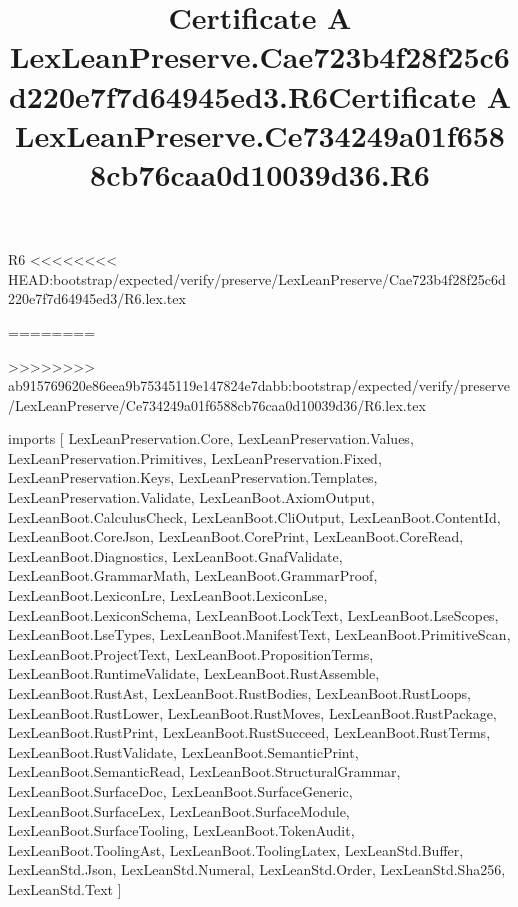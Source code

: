 \begin{lexlean}{R6}
<<<<<<<< HEAD:bootstrap/expected/verify/preserve/LexLeanPreserve/Cae723b4f28f25c6d220e7f7d64945ed3/R6.lex.tex
\title{Certificate A LexLeanPreserve.Cae723b4f28f25c6d220e7f7d64945ed3.R6}
========
\title{Certificate A LexLeanPreserve.Ce734249a01f6588cb76caa0d10039d36.R6}
>>>>>>>> ab915769620e86eea9b75345119e147824e7dabb:bootstrap/expected/verify/preserve/LexLeanPreserve/Ce734249a01f6588cb76caa0d10039d36/R6.lex.tex
\begin{coremodule}
imports [
  LexLeanPreservation.Core,
  LexLeanPreservation.Values,
  LexLeanPreservation.Primitives,
  LexLeanPreservation.Fixed,
  LexLeanPreservation.Keys,
  LexLeanPreservation.Templates,
  LexLeanPreservation.Validate,
  LexLeanBoot.AxiomOutput,
  LexLeanBoot.CalculusCheck,
  LexLeanBoot.CliOutput,
  LexLeanBoot.ContentId,
  LexLeanBoot.CoreJson,
  LexLeanBoot.CorePrint,
  LexLeanBoot.CoreRead,
  LexLeanBoot.Diagnostics,
  LexLeanBoot.GnafValidate,
  LexLeanBoot.GrammarMath,
  LexLeanBoot.GrammarProof,
  LexLeanBoot.LexiconLre,
  LexLeanBoot.LexiconLse,
  LexLeanBoot.LexiconSchema,
  LexLeanBoot.LockText,
  LexLeanBoot.LseScopes,
  LexLeanBoot.LseTypes,
  LexLeanBoot.ManifestText,
  LexLeanBoot.PrimitiveScan,
  LexLeanBoot.ProjectText,
  LexLeanBoot.PropositionTerms,
  LexLeanBoot.RuntimeValidate,
  LexLeanBoot.RustAssemble,
  LexLeanBoot.RustAst,
  LexLeanBoot.RustBodies,
  LexLeanBoot.RustLoops,
  LexLeanBoot.RustLower,
  LexLeanBoot.RustMoves,
  LexLeanBoot.RustPackage,
  LexLeanBoot.RustPrint,
  LexLeanBoot.RustSucceed,
  LexLeanBoot.RustTerms,
  LexLeanBoot.RustValidate,
  LexLeanBoot.SemanticPrint,
  LexLeanBoot.SemanticRead,
  LexLeanBoot.StructuralGrammar,
  LexLeanBoot.SurfaceDoc,
  LexLeanBoot.SurfaceGeneric,
  LexLeanBoot.SurfaceLex,
  LexLeanBoot.SurfaceModule,
  LexLeanBoot.SurfaceTooling,
  LexLeanBoot.TokenAudit,
  LexLeanBoot.ToolingAst,
  LexLeanBoot.ToolingLatex,
  LexLeanStd.Buffer,
  LexLeanStd.Json,
  LexLeanStd.Numeral,
  LexLeanStd.Order,
  LexLeanStd.Sha256,
  LexLeanStd.Text
]


\end{coremodule}
\end{lexlean}
